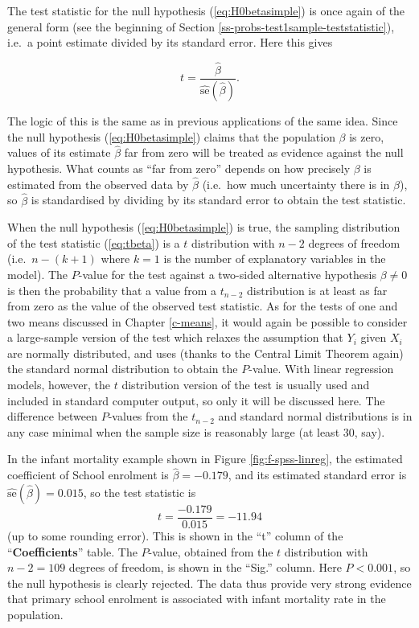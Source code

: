 \documentclass[11pt,a4paper,openany]{book}
\begin{document}
The test statistic for the null hypothesis (\ref{eq:H0betasimple}) is
once again of the general form (see the beginning of Section
\ref{ss-probs-test1sample-teststatistic}), i.e.~a point estimate divided
by its standard error. Here this gives

\begin{equation}t=\frac{\hat{\beta}}{\hat{\text{se}}(\hat{\beta})}.
\label{eq:tbeta}\end{equation}

The logic of this is the same as in previous applications of the same
idea. Since the null hypothesis (\ref{eq:H0betasimple}) claims that the
population \(\beta\) is zero, values of its estimate \(\hat{\beta}\) far
from zero will be treated as evidence against the null hypothesis. What
counts as ``far from zero'' depends on how precisely \(\beta\) is
estimated from the observed data by \(\hat{\beta}\) (i.e.~how much
uncertainty there is in \(\hat{\beta}\)), so \(\hat{\beta}\) is
standardised by dividing by its standard error to obtain the test
statistic.

When the null hypothesis (\ref{eq:H0betasimple}) is true, the sampling
distribution of the test statistic (\ref{eq:tbeta}) is a \(t\)
distribution with \(n-2\) degrees of freedom (i.e.~\(n-(k+1)\) where
\(k=1\) is the number of explanatory variables in the model). The
\(P\)-value for the test against a two-sided alternative hypothesis
\(\beta\ne 0\) is then the probability that a value from a \(t_{n-2}\)
distribution is at least as far from zero as the value of the observed
test statistic. As for the tests of one and two means discussed in
Chapter \ref{c-means}, it would again be possible to consider a
large-sample version of the test which relaxes the assumption that
\(Y_{i}\) given \(X_{i}\) are normally distributed, and uses (thanks to
the Central Limit Theorem again) the standard normal distribution to
obtain the \(P\)-value. With linear regression models, however, the
\(t\) distribution version of the test is usually used and included in
standard computer output, so only it will be discussed here. The
difference between \(P\)-values from the \(t_{n-2}\) and standard normal
distributions is in any case minimal when the sample size is reasonably
large (at least 30, say).

In the infant mortality example shown in Figure \ref{fig:f-spss-linreg},
the estimated coefficient of School enrolment is \(\hat{\beta}=-0.179\),
and its estimated standard error is
\(\hat{\text{se}}(\hat{\beta})=0.015\), so the test statistic is
\[t=\frac{-0.179}{0.015}=-11.94\] (up to some rounding error). This is
shown in the ``t'' column of the ``\textbf{Coefficients}'' table. The
\(P\)-value, obtained from the \(t\) distribution with \(n-2=109\)
degrees of freedom, is shown in the ``Sig.'' column. Here \(P<0.001\),
so the null hypothesis is clearly rejected. The data thus provide very
strong evidence that primary school enrolment is associated with infant
mortality rate in the population.
\end{document}
